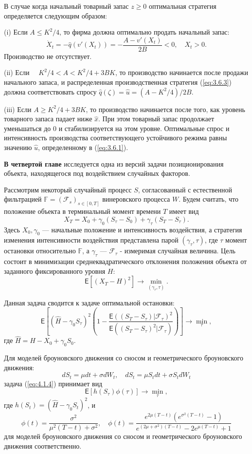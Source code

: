 \documentclass[twoside,12pt]{article}
\begin{document}
В случае когда начальный товарный запас $z\ge 0$ оптимальная стратегия определяется следующим образом:

(i) Если $A\le K^2/4$, то фирма должна оптимально продать начальный запас:
$$ \dot X_t=-\widehat q(v'(X_t))=-\frac{A-v'(X_t)}{2B}<0,\quad X_t>0.$$
Производство не отсутствует.

(ii) Если $\quad K^2/4<A< K^2/4+3BK$, то производство начинается после продажи начального запаса, и распределенная производственная стратегия (\ref{eq:3.6.3}) должна соответствовать спросу $\widehat q(\zeta)=\widehat u=(A-K^2/4)/2B$.

(iii) Если $A\ge K^2/4+3BK$, то производство начинается после того, как уровень товарного запаса падает ниже $\widehat x$. При этом товарный запас продолжает уменьшаться до $0$
и стабилизируется на этом уровне. Оптимальные спрос и интенсивность производства соответствующего устойчивого режима равны значению $\widehat u$, определенному в (\ref{eq:3.6.1}).

\textbf{В четвертой главе} исследуется одна из версий задачи позиционирования объекта, находящегося под воздействием случайных факторов.

Рассмотрим некоторый случайный процесс $S$, согласованный с естественной фильтрацией $\mathbb F=(\mathscr F_s)_{s\in [0,T]}$ винеровского процесса $W$. Будем считать, что положение объекта в терминальный момент времени $T$ имеет вид
$$X_T = X_0+\gamma_0(S_\tau-S_0) +\gamma_\tau(S_T-S_\tau).$$
Здесь $X_0, \gamma_0$ --- начальные положение и интенсивность воздействия, а стратегия изменения интенсивности воздействия представлена парой  $(\gamma_\tau,\tau)$, где $\tau$  момент остановки относительно $\mathbb F$, а $\gamma_\tau $ --- $\mathscr F_\tau$ - измеримая случайная величина. Цель состоит в минимизации среднеквадратического отклонения положения объекта от заданного фиксированного уровня $H$:
$$ \mathsf E[(X_T-H)^2] \to \min_{(\gamma_\tau,\tau)}. $$

Данная задача сводится к задаче оптимальной остановки:
\begin{equation}
 \label{eq:4.1.4}
 \mathsf E\left[(\widehat H - \gamma_0 S_\tau)^2 \left( 1-\frac{\mathsf E((S_T-S_\tau) | \mathscr F_\tau)^2}{\mathsf E((S_T-S_\tau)^2 | \mathscr F_\tau)}\right)\right] \to \min_{\tau},
 \end{equation}
где $\widehat H = H-X_0+\gamma_0 S_0$.

Для моделей броуновского движения со сносом и геометрического броуновского движения: $$dS_t=\mu dt+\sigma dW_t, \quad dS_t=\mu S_t dt+\sigma S_t dW_t$$
задача (\ref{eq:4.1.4}) принимает вид
\begin{equation}
\label{eq:4.1.7}
\mathsf E[h(S_\tau)\phi(\tau)] \to \min_{\tau},
\end{equation}			
где $h(S_t)=(\widehat H - \gamma_0 S_t)^2$, и
$$
 \phi(t)=\frac{\sigma^2}{\mu^2(T-t)+\sigma^2}, \quad \phi(t)=\frac{e^{2\mu(T-t)}(e^{\sigma^2(T-t)}-1)}{e^{(2\mu+\sigma^2)(T-t)}-2e^{\mu(T-t)}+1}
$$			
для моделей броуновского движения со сносом и геометрического броуновского движения соответственно.
\end{document}
